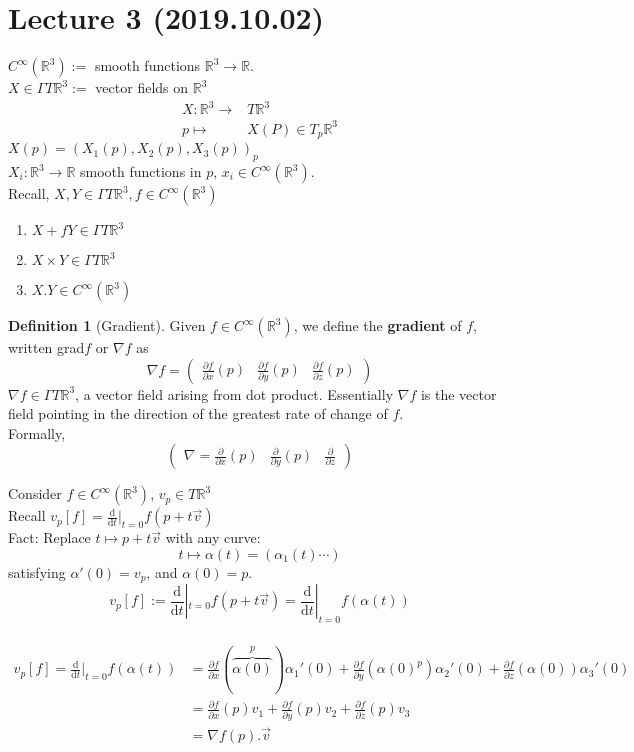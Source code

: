 \documentclass{article}
\let\ddd\cdots
\renewcommand{\d}{\mathrm{d}}
\newcommand{\R}{\mathbb{R}}
\newcommand{\dv}[2]{\frac{\d #1}{\d #2}}
\newcommand{\pdv}[2]{\frac{\partial #1}{\partial #2}}
\theoremstyle{definition}
\newtheorem{definition}{Definition}[section]
\theoremstyle{remark}
\theoremstyle{example}
\begin{document}
	\section{Lecture 3 (2019.10.02)}
	$C^\infty(\R^3) :=$ smooth functions $\R^3 \to \R$.\\
	$X \in \Gamma T \R^3 := $ vector fields on $\R^3$\\
	\begin{align*}
		X:\R^3 \to & T \R^3\\
		p \mapsto & X(P)\in T_p\R^3
	\end{align*}
	$X(p) = (X_1(p),X_2(p),X_3(p))_p$\\
	$X_i:\R^3 \to \R$ smooth functions in $p$, $x_i \in C^\infty(\R^3)$.\\
	Recall, $X,Y \in \Gamma T \R^3, f \in C^\infty(\R^3)$\\
	\begin{enumerate}
		\item $X+fY \in \Gamma T \R^3$
		\item $X \times Y \in \Gamma T \R^3$
		\item $X.Y \in C^\infty(\R^3)$
	\end{enumerate}

	\begin{definition}[Gradient]
		Given $f \in C^\infty(\R^3)$, we define the \textbf{gradient} of $f$, written grad$f$ or $\nabla f$ as 
		\[ \nabla f = \begin{pmatrix}
			\pdv{f}{x} (p) & \pdv{f}{y} (p) & \pdv{f}{z} (p) 
		\end{pmatrix}\]
		$\nabla f \in \Gamma  T \R^3$, a vector field arising from dot product. Essentially $\nabla f$ is the vector field pointing in the direction of the greatest rate of change of $f$.\\
		Formally, \[ \begin{pmatrix}
			\nabla = \pdv{}{x} (p) & \pdv{}{y} (p) & \pdv{}{z}
		\end{pmatrix} \]
	\end{definition}

	Consider $f \in C^\infty (\R^3) $, $v_p \in T \R^3$\\
	Recall $v_p[f] = \dv{}{t}|_{t=0}f(p+t \vec{v})$\\
	Fact: Replace $t \mapsto p+t \vec{v}$ with any curve: \[ t \mapsto \alpha(t)=(\alpha_1(t) \ddd)\] satisfying $\alpha'(0)=v_p$, and $\alpha(0)=p$.\\
	\[ v_p[f]:=\dv{}{t}|_{t=0} f(p+t \vec{v}) = \dv{}{t}|_{t=0} f(\alpha(t))\]\\
	\begin{align*}
		v_p[f]=\dv{}{t}|_{t=0} f(\alpha(t)) & = \pdv{f}{x}(\overbrace{\alpha(0)}^p)\alpha_1'(0) + \pdv{f}{y}(\alpha(0)^p)\alpha_2'(0) + \pdv{f}{z}(\alpha(0))\alpha_3'(0)\\
		& = \pdv{f}{x}(p)v_1 + \pdv{f}{y}(p)v_2 + \pdv{f}{z}(p)v_3\\
		& = \nabla f(p) . \vec{v}
	\end{align*}
	
\end{document}
